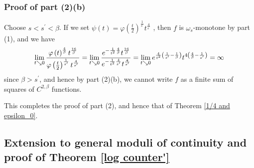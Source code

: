\documentclass{amsart}
\theoremstyle{plain}
\numberwithin{equation}{section}
\begin{document}
\subsubsection{Proof of part (2)(b)}

Choose $s<s^{\prime }<\beta $. If we set $\psi \left( t\right) =\varphi
\left( \frac{t}{2}\right) ^{\frac{1}{s^{\prime }}}t^{\frac{4}{s^{\prime }}}$%
, then $f$ is $\omega _{s}$-monotone by part (1), and we have%
\begin{equation*}
\lim_{t\searrow 0}\frac{\varphi \left( t\right) ^{\frac{4}{\beta }}t^{\frac{%
16}{\beta }}}{\varphi \left( \frac{t}{2}\right) ^{\frac{1}{s^{\prime }}}t^{%
\frac{4}{s^{\prime }}}}=\lim_{t\searrow 0}\frac{e^{-\frac{1}{t^{2}}\frac{4}{%
\beta }}t^{\frac{16}{\beta }}}{e^{-\frac{1}{t^{2}}\frac{4}{s^{\prime }}}t^{%
\frac{4}{s^{\prime }}}}=\lim_{t\searrow 0}e^{\frac{4}{t^{2}}\left( \frac{1}{%
s^{\prime }}-\frac{1}{\beta }\right) }t^{4\left( \frac{4}{\beta }-\frac{1}{%
s^{\prime }}\right) }=\infty
\end{equation*}%
since $\beta >s^{\prime }$, and hence by part (2)(b), we cannot write $f$ as
a finite sum of squares of $C^{2,\beta }$ functions.

This completes the proof of part (2), and hence that of Theorem \ref{1/4 and
epsilon_0}.

\subsection{Extension to general moduli of continuity and proof of Theorem 
\protect\ref{log counter'}}
\end{document}
